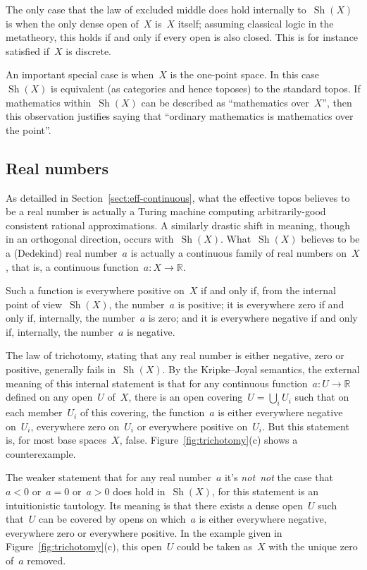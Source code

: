 \documentclass[oneside]{amsart}
\theoremstyle{definition}
\theoremstyle{plain}
\theoremstyle{remark}
\newcommand{\RR}{\mathbb{R}}
\DeclareMathOperator{\Sh}{Sh}
\renewcommand{\_}{\mathpunct{.}\,}
\newcommand{\effective}{ef{}fective\xspace}
\newcommand{\?}{\,{:}\,}
\newcommand{\notnot}{\emph{not~not}\xspace}
\begin{document}
The only case that the law of excluded middle does hold internally to~$\Sh(X)$
is when the only dense open of~$X$ is~$X$ itself; assuming classical logic in
the metatheory, this holds if and only if every open is also closed. This is
for instance satisfied if~$X$ is discrete.

An important special case is when~$X$ is the one-point space. In this
case~$\Sh(X)$ is equivalent (as categories and hence toposes) to the standard
topos. If mathematics within~$\Sh(X)$ can be described as ``mathematics
over~$X$'', then this observation justifies saying that ``ordinary mathematics
is mathematics over the point''.


\subsection{Real numbers}
As detailled in Section~\ref{sect:eff-continuous}, what the \effective topos believes to be a real number is
actually a Turing machine computing arbitrarily-good consistent rational
approximations. A similarly drastic shift in meaning, though in an orthogonal
direction, occurs with~$\Sh(X)$. What~$\Sh(X)$ believes to be a (Dedekind) real
number~$a$ is actually a continuous family of real numbers on~$X$, that is, a
continuous function~$a : X \to \RR$.

Such a function is everywhere positive on~$X$ if and only if, from the internal point of
view~$\Sh(X)$, the number~$a$ is positive; it is everywhere zero if and only
if, internally, the number~$a$ is zero; and it is everywhere negative if and
only if, internally, the number~$a$ is negative.

The law of trichotomy, stating that any real number is either negative, zero or
positive, generally fails in~$\Sh(X)$. By the Kripke--Joyal semantics, the external
meaning of this internal statement is that for any continuous function~$a : U
\to \RR$ defined on any open~$U$ of~$X$, there is an open covering~$U =
\bigcup_i U_i$ such that on each member~$U_i$ of this covering, the function~$a$ is
either everywhere negative on~$U_i$, everywhere zero on~$U_i$ or everywhere
positive on~$U_i$. But this statement is, for most base spaces~$X$, false.
Figure~\ref{fig:trichotomy}(c) shows a counterexample.

The weaker statement that for any real number~$a$ it's \notnot the case that~$a < 0$
or~$a = 0$ or~$a > 0$ does hold in~$\Sh(X)$, for this statement is an
intuitionistic tautology. Its meaning is that there exists a
dense open~$U$ such that~$U$ can be covered by opens on which~$a$ is either
everywhere negative, everywhere zero or everywhere positive. In the example
given in Figure~\ref{fig:trichotomy}(c), this open~$U$ could be taken as~$X$
with the unique zero of~$a$ removed.
\end{document}
